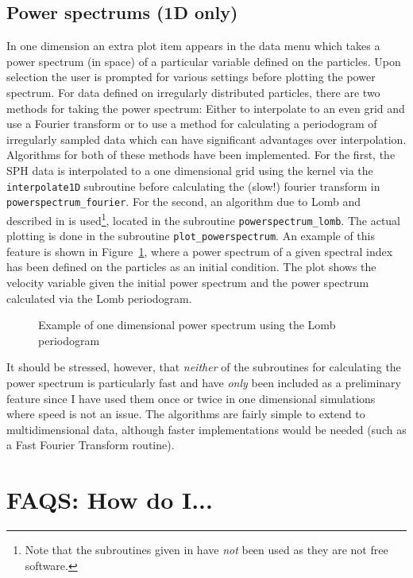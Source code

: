 \documentclass[a4paper,11pt]{article}
\begin{document}
\subsection{Power spectrums (1D only)}
 In one dimension an extra plot item appears
in the data menu which takes a power spectrum (in space) of a particular
variable defined on the particles. Upon selection the user is prompted for
various settings before plotting the power spectrum. For data defined on
irregularly distributed particles, there are two methods for taking the power
spectrum: Either to interpolate to an even grid and use a Fourier
transform or to use a method for calculating a periodogram of
irregularly sampled data which can have significant advantages over
interpolation. Algorithms for both of these methods have been
implemented. For the first, the SPH data is interpolated to a one dimensional
grid using the kernel via the \verb+interpolate1D+ subroutine before calculating the (slow!) fourier
transform in \verb+powerspectrum_fourier+. For the second, an algorithm due to
Lomb and \citet{scargle81} described in \citet{numericalrecipes} is
used\footnote{Note that the subroutines given in \citet{numericalrecipes} have
\emph{not} been used as they are not free software.},
located in the subroutine \verb+powerspectrum_lomb+. The actual plotting is done
in the subroutine \verb+plot_powerspectrum+. An example of this feature is shown
in Figure~\ref{fig:powerspectrum_lomb}, where a power spectrum of a given
spectral index has been defined on the particles as an initial condition. The
plot shows the velocity variable given the initial power spectrum and the power
spectrum calculated via the Lomb periodogram.
\begin{figure}
\centering

\caption{Example of one dimensional power spectrum using the Lomb periodogram}
\label{fig:powerspectrum_lomb}
\end{figure}

 It should be stressed, however, that \emph{neither} of the subroutines for
calculating the power spectrum is particularly fast and have \emph{only} been included as a preliminary feature
since I have used them once or twice in one dimensional simulations where speed
is not an issue. The algorithms are fairly simple to extend to multidimensional
data, although faster implementations would be needed (such as a Fast
Fourier Transform routine).


\section{FAQS: How do I...}
\end{document}
